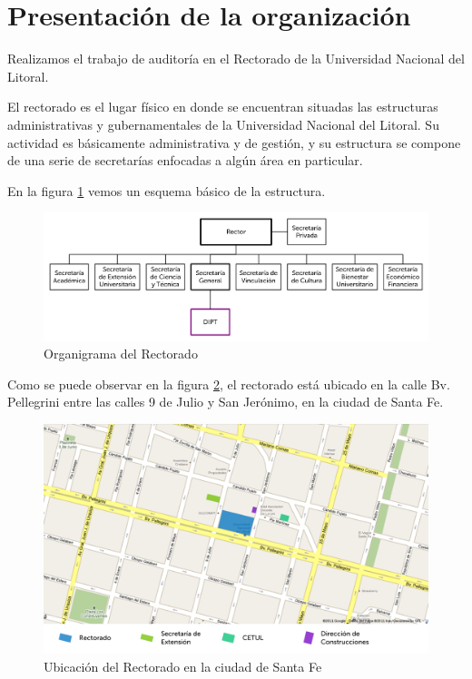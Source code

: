 \documentclass[a4paper,11pt,oneside]{article}
\begin{document}
\maketitle
%
%
\section{Presentación de la organización}
%
Realizamos el trabajo de auditoría en el Rectorado de la Universidad
Nacional del Litoral.

El rectorado es el lugar físico en donde se encuentran situadas las
estructuras administrativas y gubernamentales de la Universidad
Nacional del Litoral.  Su actividad es básicamente administrativa y de
gestión, y su estructura se compone de una serie de secretarías
enfocadas a algún área en particular.

En la figura \ref{organi-rectorado} vemos un esquema básico de la estructura.
%
\begin{figure}[H]
  \center\includegraphics[width=\textwidth]{img/organi_rectorado}
  \caption{Organigrama del Rectorado}
  \label{organi-rectorado}
\end{figure}

Como se puede observar en la figura \ref{mapa-ubicación}, el rectorado
está ubicado en la calle Bv. Pellegrini entre las calles 9 de Julio y
San Jerónimo, en la ciudad de Santa Fe.

\begin{figure}
  \center\includegraphics[width=\textwidth]{img/ubicacion_rect}
  \caption{Ubicación del Rectorado en la ciudad de Santa Fe}
  \label{mapa-ubicación}
\end{figure}
\end{document}
